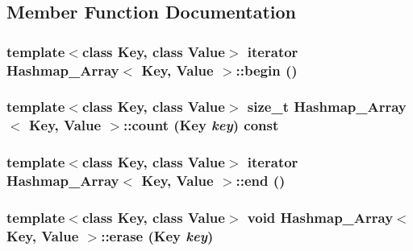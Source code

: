 \subsection{Member Function Documentation}
\hypertarget{class_hashmap___array_a35beea246e2f628b6dfc025210ececda}{
\subsubsection[{begin}]{\setlength{\rightskip}{0pt plus 5cm}template$<$class Key, class Value$>$ {\bf iterator} {\bf Hashmap\_\-Array}$<$ Key, Value $>$::begin ()}}
\label{class_hashmap___array_a35beea246e2f628b6dfc025210ececda}
\hypertarget{class_hashmap___array_a9db5027ea4a86a0e9907f017025b048f}{
\subsubsection[{count}]{\setlength{\rightskip}{0pt plus 5cm}template$<$class Key, class Value$>$ size\_\-t {\bf Hashmap\_\-Array}$<$ Key, Value $>$::count (Key {\em key}) const}}
\label{class_hashmap___array_a9db5027ea4a86a0e9907f017025b048f}
\hypertarget{class_hashmap___array_abd1273f016c450ddf9f400904a28e5ce}{
\subsubsection[{end}]{\setlength{\rightskip}{0pt plus 5cm}template$<$class Key, class Value$>$ {\bf iterator} {\bf Hashmap\_\-Array}$<$ Key, Value $>$::end ()}}
\label{class_hashmap___array_abd1273f016c450ddf9f400904a28e5ce}
\hypertarget{class_hashmap___array_a0397d0bf1b29c5e71341b4f0c85b5bf1}{
\subsubsection[{erase}]{\setlength{\rightskip}{0pt plus 5cm}template$<$class Key, class Value$>$ void {\bf Hashmap\_\-Array}$<$ Key, Value $>$::erase (Key {\em key})}}
